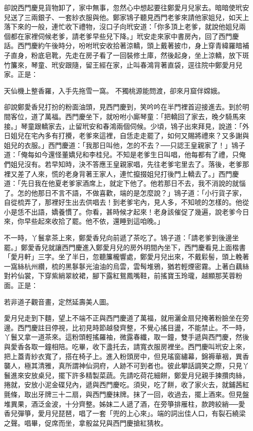 \begin{showcontents}{}
卻說西門慶見貨物卸了，家中無事，忽然心中想起要往鄭愛月兒家去。暗暗使玳安兒送了三兩銀子、一套紗衣服與他。鄭家鴇子聽見西門老爹來請他家姐兒，如天上落下來的一般，連忙收下禮物，沒口子向玳安道：「你多頂上老爹，就說他姐兒兩個都在家裡伺候老爹，請老爹早些兒下降。」玳安走來家中書房內，回了西門慶話。西門慶約午後時分，吩咐玳安收拾著涼轎，頭上戴著披巾，身上穿青緯羅暗補子直身，粉底皂靴，先走在房子看了一回裝修土庫，然後起身，坐上涼轎，放下斑竹簾來，琴童、玳安跟隨，留王經在家，止叫春鴻背著直袋，逕往院中鄭愛月兒家。正是：

天仙機上整香羅，入手先拖雪一窩。
不獨桃源能問渡，卻來月窟伴嫦娥。

卻說鄭愛香兒打扮的粉面油頭，見西門慶到，笑吟吟在半門裡首迎接進去。到於明間客位，道了萬福。西門慶坐下，就吩咐小廝琴童：「把轎回了家去，晚夕騎馬來接。」琴童跟轎家去，止留玳安和春鴻兩個伺候。少頃，鴇子出來拜見，說道：「外日姐兒在宅內多有打攪，老爹來這裡，自恁走走罷了，如何又賜將禮來？又多謝與姐兒的衣服。」西門慶道：「我那日叫他，怎的不去？──只認王皇親家了！」鴇子道：「俺每如今還怪董嬌兒和李桂兒。不知是老爹生日叫唱，他每都有了禮，只俺們姐兒沒有。若早知時，決不答應王皇親家唱，先往老爹宅里去了。落後，老爹那裡又差了人來，慌的老身背著王家人，連忙攛掇姐兒打後門上轎去了。」西門慶道：「先日我在他夏老爹家酒席上，就定下他了。他若那日不去，我不消說的就惱了。怎的他那日不言不語，不做喜歡，端的是怎麼說？」鴇子道：「小行貨子家，自從梳弄了，那裡好生出去供唱去！到老爹宅內，見人多，不知唬的怎樣的。他從小是恁不出語，嬌養慣了。你看，甚時候才起來！老身該催促了幾遍，說老爹今日來，你早些起來收拾了罷。他不依，還睡到這咱晚。」

不一時，丫鬟拿茶上來，鄭愛香兒向前遞了茶吃了。鴇子道：「請老爹到後邊坐罷。」鄭愛香兒就讓西門慶進入鄭愛月兒的房外明間內坐下，西門慶看見上面楷書 「愛月軒」三字。坐了半日，忽聽簾櫳響處，鄭愛月兒出來，不戴鬏髻，頭上輓著一窩絲杭州纘，梳的黑鬖鬖光油油的烏雲，雲髩堆鴉，猶若輕煙密霧。上著白藕絲對衿仙裳，下穿紫綃翠紋裙，腳下露紅鴛鳳嘴鞋，前搖寶玉玲瓏，越顯那芙蓉粉面。正是：

若非道子觀音畫，定然延壽美人圖。

愛月兒走到下麵，望上不端不正與西門慶道了萬福，就用灑金扇兒掩著粉臉坐在旁邊。西門慶註目停視，比初見時節越發齊整，不覺心搖目盪，不能禁止。不一時，丫鬟又拿一道茶來。這粉頭輕搖羅袖，微露春纖，取一鐘，雙手遞與西門慶，然後與愛香各取一鐘相陪。吃畢，收下盞托去，請寬衣服房裡坐。西門慶叫玳安上來，把上蓋青紗衣寬了，搭在椅子上。進入粉頭房中，但見瑤窗繡幕，錦褥華裀，異香襲人，極其清雅，真所謂神仙洞府，人跡不可到者也。彼此攀話調笑之際，只見丫鬟進來安放桌兒，擺下許多精製菜蔬。先請吃荷花細餅，鄭愛月兒親手揀攢肉絲，捲就，安放小泥金碟兒內，遞與西門慶吃。須臾，吃了餅，收了家火去，就鋪茜紅氈條，取出牙牌三十二扇，與西門慶抹牌。抹了一回，收過去，擺上酒來。但見盤堆異果，酒泛金波，十分齊整。姊妹二人遞了酒，在旁箏排雁柱，款跨絞綃──愛香兒彈箏，愛月兒琵琶，唱了一套「兜的上心來」。端的詞出佳人口，有裂石繞梁之聲。唱畢，促席而坐，拿骰盆兒與西門慶搶紅猜枚。


\end{showcontents}
